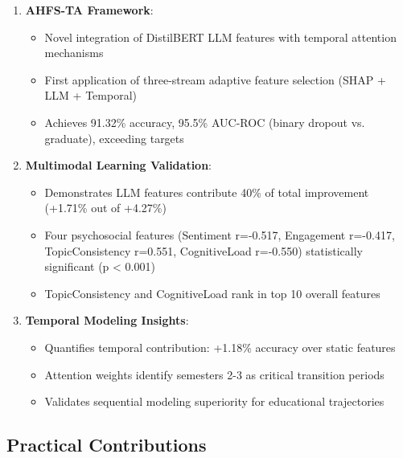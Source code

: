 \begin{enumerate}
\item \textbf{AHFS-TA Framework}:
\begin{itemize}
\item Novel integration of DistilBERT LLM features with temporal attention mechanisms
\item First application of three-stream adaptive feature selection (SHAP + LLM + Temporal)
\item Achieves 91.32\% accuracy, 95.5\% AUC-ROC (binary dropout vs. graduate), exceeding targets
\end{itemize}

\item \textbf{Multimodal Learning Validation}:
\begin{itemize}
\item Demonstrates LLM features contribute 40\% of total improvement (+1.71\% out of +4.27\%)
\item Four psychosocial features (Sentiment r=-0.517, Engagement r=-0.417, TopicConsistency r=0.551, CognitiveLoad r=-0.550) statistically significant (p < 0.001)
\item TopicConsistency and CognitiveLoad rank in top 10 overall features
\end{itemize}

\item \textbf{Temporal Modeling Insights}:
\begin{itemize}
\item Quantifies temporal contribution: +1.18\% accuracy over static features
\item Attention weights identify semesters 2-3 as critical transition periods
\item Validates sequential modeling superiority for educational trajectories
\end{itemize}
\end{enumerate}

\subsection{Practical Contributions}

